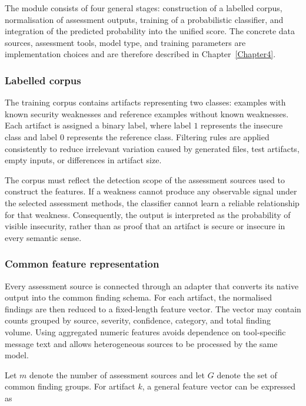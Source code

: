 The module consists of four general stages: construction of a labelled corpus,
normalisation of assessment outputs, training of a probabilistic classifier, and
integration of the predicted probability into the unified score. The concrete data
sources, assessment tools, model type, and training parameters are implementation choices
and are therefore described in Chapter~\ref{Chapter4}.

\subsubsection{Labelled corpus}
\label{subsubsec:rs-dataset}

The training corpus contains artifacts representing two classes: examples with known
security weaknesses and reference examples without known weaknesses. Each artifact is
assigned a binary label, where label $1$ represents the insecure class and label $0$
represents the reference class. Filtering rules are applied consistently to reduce
irrelevant variation caused by generated files, test artifacts, empty inputs, or differences in artifact size.

The corpus must reflect the detection scope of the assessment sources used to construct
the features. If a weakness cannot produce any observable signal under the selected
assessment methods, the classifier cannot learn a reliable relationship for that
weakness. Consequently, the output is interpreted as the probability of visible insecurity, rather than as proof that an artifact is secure or
insecure in every semantic sense.

\subsubsection{Common feature representation}
\label{subsubsec:rs-features}

Every assessment source is connected through an adapter that converts its native output
into the common finding schema. For each artifact, the normalised findings are then
reduced to a fixed-length feature vector. The vector may contain counts grouped by source,
severity, confidence, category, and total finding volume. Using aggregated numeric
features avoids dependence on tool-specific message text and allows heterogeneous sources
to be processed by the same model.

Let $m$ denote the number of assessment sources and let $G$ denote the set of common
finding groups. For artifact $k$, a general feature vector can be expressed as

